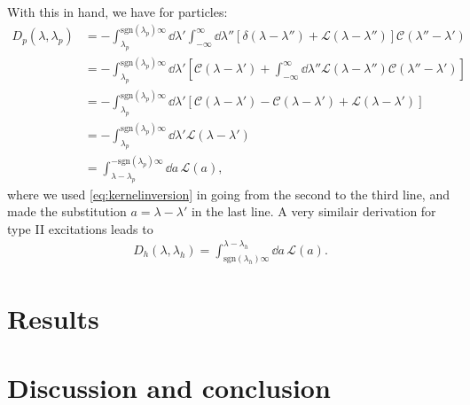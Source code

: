 \documentclass[11pt, a4paper,draft]{report} %
\newcommand{\inversetruncc}{\mathcal{L}}
\newcommand{\kernel}{\mathcal{C}}
\begin{document}
With this in hand, we have for particles:
\begin{align}
	D_p(\lambda, \lambda_p) &= - \int_{\lambda_p}^{\textrm{sgn}(\lambda_p)\infty} \dd \lambda' \int_{-\infty}^{\infty} \dd  \lambda'' \left[\delta(\lambda-\lambda'') + \inversetruncc(\lambda-\lambda'') \right]\kernel(\lambda''-\lambda')\\
	&= - \int_{\lambda_p}^{\textrm{sgn}(\lambda_p)\infty} \dd \lambda' \left[\kernel(\lambda-\lambda') + \int_{-\infty}^{\infty} \dd  \lambda'' \inversetruncc(\lambda-\lambda'') \kernel(\lambda''-\lambda')\right]\\
	&= - \int_{\lambda_p}^{\textrm{sgn}(\lambda_p)\infty} \dd \lambda' \left[\kernel(\lambda-\lambda') - \kernel(\lambda-\lambda') + \inversetruncc(\lambda-\lambda')\right]\\
	&= - \int_{\lambda_p}^{\textrm{sgn}(\lambda_p)\infty} \dd \lambda' \inversetruncc(\lambda-\lambda')\\
	&=  \int_{\lambda-\lambda_p}^{-\textrm{sgn}(\lambda_p)\infty} \dd a \, \inversetruncc(a),
\end{align}
where we used \cref{eq:kernelinversion} in going from the second to the third line, and made the substitution \(a = \lambda-\lambda'\) in the last line.
A very similair derivation for type II excitations leads to
\begin{align}
	D_h(\lambda,\lambda_h) = \int_{\textrm{sgn}(\lambda_h)\infty}^{\lambda-\lambda_h} \dd a\, \inversetruncc(a).
\end{align}

\chapter{Results}

\chapter{Discussion and conclusion}




\end{document}
